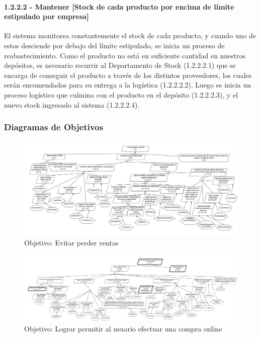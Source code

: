 \paragraph{1.2.2.2 - Mantener [Stock de cada producto por encima de límite estipulado por empresa]} \label{para:1.2.2.2}

El sistema monitorea constantemente el stock de cada producto, y cuando uno de
estos desciende por debajo del límite estipulado, se inicia un proceso de
reabastecimiento. Como el producto no está en suficiente cantidad en nuestros
depósitos, es necesario recurrir al Departamento de Stock (1.2.2.2.1) que se
encarga de conseguir el producto a través de los distintos proveedores, los
cuales serán encomendados para su entrega a la logística (1.2.2.2.2). Luego se
inicia un proceso logístico que culmina con el producto en el depósito
(1.2.2.2.3), y el nuevo stock ingresado al sistema (1.2.2.2.4).

\subsubsection{Diagramas de Objetivos}
\vspace{-10em}
\begin{figure}[ht]\begin{center}
  \includegraphics[angle=90,height=.9\textheight]{tp1/images/objetivos-raiz.pdf}
  \caption{Objetivo: Evitar perder ventas}
\end{center}\end{figure}

\begin{figure}[ht]\begin{center}
  \includegraphics[angle=90,height=.9\textheight]{tp1/images/objetivos-operacion-online.pdf}
  \caption{Objetivo: Lograr permitir al usuario efectuar una compra online}
\end{center}\end{figure}

